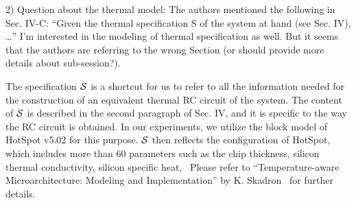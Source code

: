 \begin{reviewer}
2) Question about the thermal model: The authors mentioned the following in Sec. IV-C: ``Given the thermal specification S of the system at hand (see Sec. IV), \ldots'' I’m interested in the modeling of thermal specification as well. But it seems that the authors are referring to the wrong Section (or should provide more details about sub-session?).
\end{reviewer}
\begin{authors}
The specification $\mathcal{S}$ is a shortcut for us to refer to all the information needed for the construction of an equivalent thermal RC circuit of the system.
The content of $\mathcal{S}$ is described in the second paragraph of Sec. IV, and it is specific to the way the RC circuit is obtained.
In our experiments, we utilize the block model of HotSpot v5.02 for this purpose.
$\mathcal{S}$ then reflects the configuration of HotSpot, which includes more than 60 parameters such as the chip thickness, silicon thermal conductivity, silicon specific heat, \etc\ Please refer to ``Temperature-aware Microarchitecture: Modeling and Implementation'' by K. Skadron \etal\ for further details.



\end{authors}

